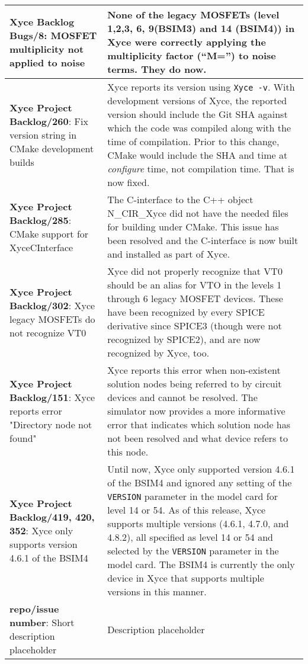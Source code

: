 {\begin{longtable}[h] {>{\raggedright\small}m{2in}|>{\raggedright\let\\\tabularnewline\small}m{3.5in}}
\textbf{Xyce Backlog Bugs/8}: MOSFET multiplicity not applied to noise &
None of the legacy MOSFETs (level 1,2,3, 6, 9(BSIM3) and 14 (BSIM4))
in Xyce were correctly applying the multiplicity factor (``M='') to
noise terms.  They do now. \\ \hline

\textbf{Xyce Project Backlog/260}: Fix version string in CMake development builds &
Xyce reports its version using \texttt{Xyce -v}.  With development versions of
Xyce, the reported version should include the Git SHA against which the code
was compiled along with the time of compilation. Prior to this change, CMake
would include the SHA and time at \emph{configure} time, not compilation time.
That is now fixed. \\ \hline

\textbf{Xyce Project Backlog/285}: CMake support for XyceCInterface &
The C-interface to the C++ object N\_CIR\_Xyce did not have the needed
files for building under CMake.  This issue has been resolved and the 
C-interface is now built and installed as part of Xyce. \\ \hline

\textbf{Xyce Project Backlog/302}: Xyce legacy MOSFETs do not recognize VT0 &
Xyce did not properly recognize that VT0 should be an alias for VTO in
the levels 1 through 6 legacy MOSFET devices.  These have been
recognized by every SPICE derivative since SPICE3 (though were not
recognized by SPICE2), and are now recognized by Xyce, too. \\ \hline

\textbf{Xyce Project Backlog/151}: Xyce reports error "Directory node not found" &
Xyce reports this error when non-existent solution nodes being referred to
by circuit devices and cannot be resolved.  The simulator now provides a more
informative error that indicates which solution node has not been resolved and
what device refers to this node. \\ \hline

\textbf{Xyce Project Backlog/419, 420, 352}:  Xyce only supports version 4.6.1 of the BSIM4 &
Until now, Xyce only supported version 4.6.1 of the BSIM4 and ignored
any setting of the \texttt{VERSION} parameter in the model card for level
14 or 54.  As of this release, Xyce supports multiple versions (4.6.1,
4.7.0, and 4.8.2), all specified as level 14 or 54 and selected by
the \texttt{VERSION} parameter in the model card.  The BSIM4 is
currently the only device in Xyce that supports multiple versions in
this manner. \\ \hline

\textbf{repo/issue number}: Short description placeholder &
Description placeholder \\ \hline

\end{longtable}
}

